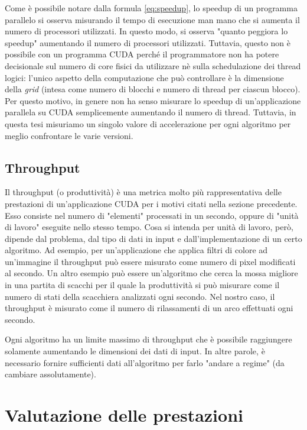 \documentclass[12pt,a4paper]{book}
\begin{document}
	Come è possibile notare dalla formula \ref{eq:speedup}, lo speedup di un programma parallelo si osserva misurando il tempo di esecuzione man mano che si aumenta il numero di processori utilizzati. In questo modo, si osserva "quanto peggiora lo speedup" aumentando il numero di processori utilizzati. Tuttavia, questo non è possibile con un programma CUDA perché il programmatore non ha potere decisionale sul numero di core fisici da utilizzare nè sulla schedulazione dei thread logici: l'unico aspetto della computazione che può controllare è la dimensione della \textit{grid} (intesa come numero di blocchi e numero di thread per ciascun blocco). Per questo motivo, in genere non ha senso misurare lo speedup di un'applicazione parallela su CUDA semplicemente aumentando il numero di thread. Tuttavia, in questa tesi misuriamo un singolo valore di accelerazione per ogni algoritmo per meglio confrontare le varie versioni.
	
	\section{Throughput}
	Il throughput (o produttività) è una metrica molto più rappresentativa delle prestazioni di un'applicazione CUDA per i motivi citati nella sezione precedente. Esso consiste nel numero di "elementi" processati in un secondo, oppure di "unità di lavoro" eseguite nello stesso tempo. Cosa si intenda per unità di lavoro, però, dipende dal problema, dal tipo di dati in input e dall'implementazione di un certo algoritmo. Ad esempio, per un'applicazione che applica filtri di colore ad un'immagine il throughput può essere misurato come numero di pixel modificati al secondo. Un altro esempio può essere un'algoritmo che cerca la mossa migliore in una partita di scacchi per il quale la produttività si può misurare come il numero di stati della scacchiera analizzati ogni secondo. Nel nostro caso, il throughput è misurato come il numero di rilassamenti di un arco effettuati ogni secondo.
	
	Ogni algoritmo ha un limite massimo di throughput che è possibile raggiungere solamente aumentando le dimensioni dei dati di input. In altre parole, è necessario fornire sufficienti dati all'algoritmo per farlo "andare a regime" (da cambiare assolutamente).
	
	\chapter{Valutazione delle prestazioni}
	\label{section:perf}
	
\end{document}
